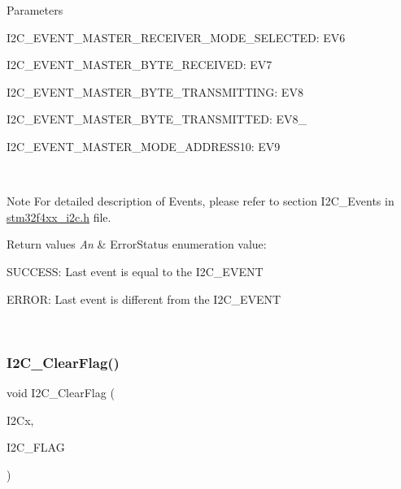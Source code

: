 \begin{DoxyParams}{Parameters}
\begin{DoxyItemize}
 \item I2\+C\+\_\+\+E\+V\+E\+N\+T\+\_\+\+M\+A\+S\+T\+E\+R\+\_\+\+R\+E\+C\+E\+I\+V\+E\+R\+\_\+\+M\+O\+D\+E\+\_\+\+S\+E\+L\+E\+C\+T\+ED\+: E\+V6 \item I2\+C\+\_\+\+E\+V\+E\+N\+T\+\_\+\+M\+A\+S\+T\+E\+R\+\_\+\+B\+Y\+T\+E\+\_\+\+R\+E\+C\+E\+I\+V\+ED\+: E\+V7 \item I2\+C\+\_\+\+E\+V\+E\+N\+T\+\_\+\+M\+A\+S\+T\+E\+R\+\_\+\+B\+Y\+T\+E\+\_\+\+T\+R\+A\+N\+S\+M\+I\+T\+T\+I\+NG\+: E\+V8 \item I2\+C\+\_\+\+E\+V\+E\+N\+T\+\_\+\+M\+A\+S\+T\+E\+R\+\_\+\+B\+Y\+T\+E\+\_\+\+T\+R\+A\+N\+S\+M\+I\+T\+T\+ED\+: E\+V8\+\_ \item I2\+C\+\_\+\+E\+V\+E\+N\+T\+\_\+\+M\+A\+S\+T\+E\+R\+\_\+\+M\+O\+D\+E\+\_\+\+A\+D\+D\+R\+E\+S\+S10\+: E\+V9\end{DoxyItemize}
\\
\hline
\end{DoxyParams}
\begin{DoxyNote}{Note}
For detailed description of Events, please refer to section I2\+C\+\_\+\+Events in \mbox{\hyperlink{stm32f4xx__i2c_8h}{stm32f4xx\+\_\+i2c.\+h}} file.
\end{DoxyNote}

\begin{DoxyRetVals}{Return values}
{\em An} & Error\+Status enumeration value\+:
\begin{DoxyItemize}
\item S\+U\+C\+C\+E\+SS\+: Last event is equal to the I2\+C\+\_\+\+E\+V\+E\+NT
\item E\+R\+R\+OR\+: Last event is different from the I2\+C\+\_\+\+E\+V\+E\+NT 
\end{DoxyItemize}\\
\hline
\end{DoxyRetVals}
\mbox{\label{group___i2_c___group5_ga9d4f8fe9f7232696114b5578b1223963}} 
\subsubsection{\texorpdfstring{I2\+C\+\_\+\+Clear\+Flag()}{I2C\_ClearFlag()}}
{\footnotesize\ttfamily void I2\+C\+\_\+\+Clear\+Flag (\begin{DoxyParamCaption}\item[{I2\+C\+\_\+\+Type\+Def $\ast$}]{I2\+Cx,  }\item[{uint32\+\_\+t}]{I2\+C\+\_\+\+F\+L\+AG }\end{DoxyParamCaption})}



